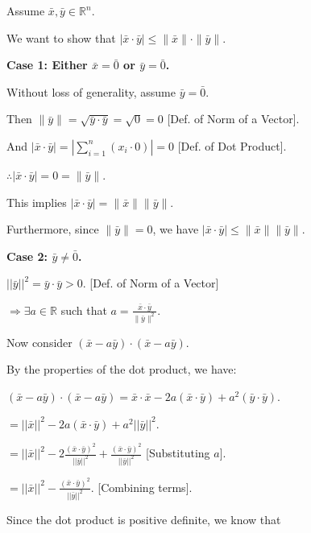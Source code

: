 
\begin{proofbox}
\begingroup
\setlength{\baselineskip}{1.5\baselineskip} 

Assume $\bar{x}, \bar{y} \in \mathbb{R}^n$.

We want to show that $|\bar{x} \cdot \bar{y}| \leq \|\bar{x}\| \cdot \|\bar{y}\|$.

\textbf{Case 1: Either $\bar{x} = \bar{0}$ or $\bar{y} = \bar{0}$.}

\quad Without loss of generality, assume $\bar{y} = \bar{0}$.

\quad Then $\|\bar{y}\| = \sqrt{\bar{y} \cdot \bar{y}} = \sqrt{0} = 0$ \hfill [Def. of Norm of a Vector].

\quad And $|\bar{x} \cdot \bar{y}| = |\sum_{i=1}^n (x_i \cdot 0)| = 0$ \hfill [Def. of Dot Product].

\quad $\therefore |\bar{x} \cdot \bar{y}| = 0 = \|\bar{y}\|$.

\quad This implies $|\bar{x} \cdot \bar{y}| = \|\bar{x}\| \|\bar{y}\|$.

\quad Furthermore, since $\|\bar{y}\| = 0$, we have $|\bar{x} \cdot \bar{y}| \leq \|\bar{x}\| \|\bar{y}\|$.

\textbf{Case 2: $\bar{y} \neq \bar{0}$.}

\quad $||\bar{y}||^2 = \bar{y} \cdot \bar{y} > 0$. \hfill [Def. of Norm of a Vector]

\quad $\Rightarrow \exists a \in \mathbb{R}$ such that $a = \frac{\bar{x} \cdot \bar{y}}{\|\bar{y}\|^2}$.

\quad Now consider $(\bar{x} - a \bar{y}) \cdot (\bar{x} - a \bar{y})$.

\quad By the properties of the dot product, we have:

\quad $(\bar{x} - a \bar{y}) \cdot (\bar{x} - a \bar{y}) = \bar{x} \cdot \bar{x} - 2a(\bar{x} \cdot \bar{y}) + a^2(\bar{y} \cdot \bar{y})$.

\quad $= ||\bar{x}||^2 - 2a(\bar{x} \cdot \bar{y}) + a^2 ||\bar{y}||^2$.

\quad $= ||\bar{x}||^2 - 2 \frac{(\bar{x} \cdot \bar{y})^2}{||\bar{y}||^2} + \frac{(\bar{x} \cdot \bar{y})^2}{||\bar{y}||^2}$ \hfill [Substituting $a$].

\quad $= ||\bar{x}||^2 - \frac{(\bar{x} \cdot \bar{y})^2}{||\bar{y}||^2}$. \hfill [Combining terms].

Since the dot product is positive definite, we know that 


\end{proofbox}
